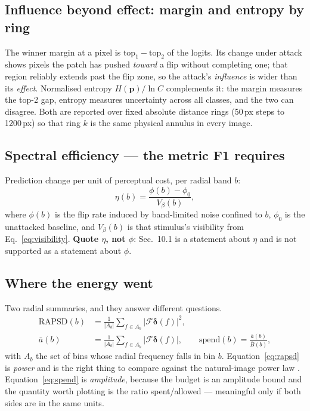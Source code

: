 \documentclass[11pt,a4paper]{article}
\begin{document}
\subsection{Influence beyond effect: margin and entropy by ring}

The winner margin at a pixel is
$\mathrm{top}_1-\mathrm{top}_2$ of the logits. Its change under attack shows
pixels the patch has pushed \emph{toward} a flip without completing one;
that region reliably extends past the flip zone, so the attack's
\emph{influence} is wider than its \emph{effect}. Normalised entropy
$H(\mathbf{p})/\ln C$ complements it: the margin measures the top-2 gap,
entropy measures uncertainty across all classes, and the two can disagree.
Both are reported over fixed absolute distance rings (50\,px steps to
1200\,px) so that ring $k$ is the same physical annulus in every image.

\subsection{Spectral efficiency --- the metric F1 requires}

Prediction change per unit of perceptual cost, per radial band $b$:
\begin{equation}
  \eta(b) = \frac{\phi(b)-\phi_0}{V_\beta(b)} ,
  \label{eq:efficiency}
\end{equation}
where $\phi(b)$ is the flip rate induced by band-limited noise confined to
$b$, $\phi_0$ is the unattacked baseline, and $V_\beta(b)$ is that
stimulus's visibility from Eq.~\eqref{eq:visibility}. \textbf{Quote $\eta$,
not $\phi$}: Sec.~10.1 is a statement about $\eta$ and is not supported as a
statement about $\phi$.

\subsection{Where the energy went}

Two radial summaries, and they answer different questions.
\begin{align}
  \mathrm{RAPSD}(b) &= \frac{1}{|A_b|}\sum_{f\in A_b}
     \big|\mathcal{F}\boldsymbol{\delta}(f)\big|^2 ,
     \label{eq:rapsd}\\
  \bar a(b) &= \frac{1}{|A_b|}\sum_{f\in A_b}
     \big|\mathcal{F}\boldsymbol{\delta}(f)\big| ,
     \qquad
  \mathrm{spend}(b) = \frac{\bar a(b)}{\bar B(b)} ,
  \label{eq:spend}
\end{align}
with $A_b$ the set of bins whose radial frequency falls in bin $b$.
Equation~\eqref{eq:rapsd} is \emph{power} \citep{ruzanski2011rapsd} and is
the right thing to compare against the natural-image power law
\citep{field1987}. Equation~\eqref{eq:spend} is \emph{amplitude}, because
the budget is an amplitude bound and the quantity worth plotting is the
ratio spent/allowed --- meaningful only if both sides are in the same units.
\end{document}
